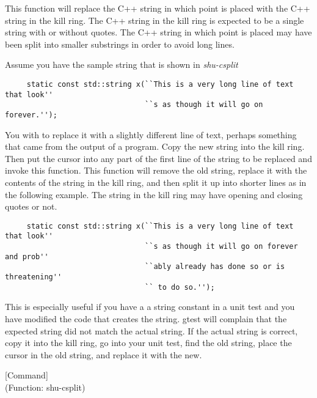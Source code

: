 \begin{doc-string}
This function will replace the C++ string in which point is placed with the
C++ string in the kill ring.  The C++ string in the kill ring is expected to be
a single string with or without quotes.  The C++ string in which point is placed
may have been split into smaller substrings in order to avoid long lines.

Assume you have the sample string that is shown in \emph{shu-csplit}

\small{\begin{verbatim}
     static const std::string x(``This is a very long line of text that look''
                                ``s as though it will go on forever.'');
\end{verbatim}}

You with to replace it with a slightly different line of text, perhaps something
that came from the output of a program.  Copy the new string into the kill ring.
Then put the cursor into any part of the first line of the string to be replaced
and invoke this function.  This function will remove the old string, replace it
with the contents of the string in the kill ring, and then split it up into
shorter lines as in the following example.  The string in the kill ring may have
opening and closing quotes or not.

\small{\begin{verbatim}
     static const std::string x(``This is a very long line of text that look''
                                ``s as though it will go on forever and prob''
                                ``ably already has done so or is threatening''
                                `` to do so.'');
\end{verbatim}}

This is especially useful if you have a a string constant in a unit test and you
have modified the code that creates the string.  gtest will complain that the
expected string did not match the actual string.  If the actual string is
correct, copy it into the kill ring, go into your unit test, find the old
string, place the cursor in the old string, and replace it with the new.
\end{doc-string}

\vspace{1em}
\noindent
{}
\usebox{\funcname}
 \hfill [Command]\\%
 (Function: shu-csplit)

